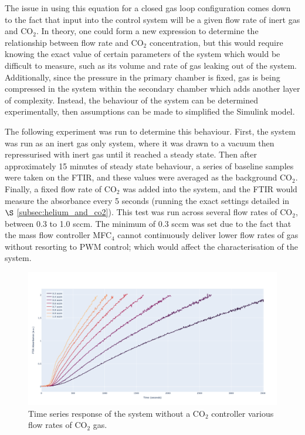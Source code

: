 The issue in using this equation for a closed gas loop configuration comes down to the fact that input into the control system will be a given flow rate of inert gas and CO$_2$. In theory, one could form a new expression to determine the relationship between flow rate and CO$_2$ concentration, but this would require knowing the exact value of certain parameters of the system which would be difficult to measure, such as its volume and rate of gas leaking out of the system. Additionally, since the pressure in the primary chamber is fixed, gas is being compressed in the system within the secondary chamber which adds another layer of complexity. Instead, the behaviour of the system can be determined experimentally, then assumptions can be made to simplified the Simulink model.

The following experiment was run to determine this behaviour. First, the system was run as an inert gas only system, where it was drawn to a vacuum then repressurised with inert gas until it reached a steady state. Then after approximately 15 minutes of steady state behaviour, a series of baseline samples were taken on the FTIR, and these values were averaged as the background CO$_2$. Finally, a fixed flow rate of CO$_2$ was added into the system, and the FTIR would measure the absorbance every 5 seconds (running the exact settings detailed in $\S$ \ref{subsec:helium_and_co2}). This test was run across several flow rates of CO$_2$, between 0.3 to 1.0 sccm. The minimum of 0.3 sccm was set due to the fact that the mass flow controller MFC$_4$ cannot continuously deliver lower flow rates of gas without resorting to PWM control; which would affect the characterisation of the system.  

\begin{figure}[h!]
	\centering
	\includegraphics[width=\linewidth]{chapter_5/figures/CO2_gas_characteristation_raw.png}
	\caption{Time series response of the system without a CO$_2$ controller various flow rates of CO$_2$ gas.}
	\label{fig:CO2_gas_characteristation_raw}
\end{figure}


